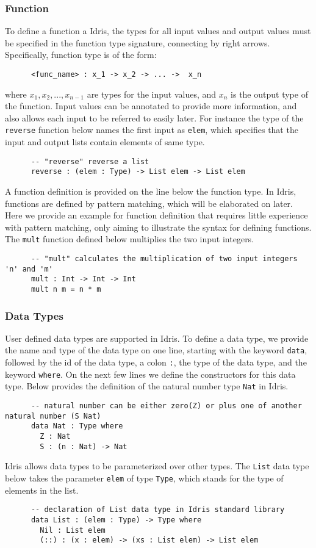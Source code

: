 \subsubsection*{Function}
To define a function a Idris, the types for all input values and output values must be specified in the function type signature, connecting by right arrows. Specifically, function type is of the form: 
\begin{lstlisting}
      <func_name> : x_1 -> x_2 -> ... ->  x_n
\end{lstlisting}
where $x_1, x_2, ..., x_{n-1}$ are types for the input values, and $x_n$ is the output type of the function. Input values can be annotated to provide more information, and also allows each input to be referred to easily later. For instance the type of the \texttt{reverse} function below names the first input as \texttt{elem}, which specifies that the input and output lists contain elements of same type. 
\begin{lstlisting}
      -- "reverse" reverse a list
      reverse : (elem : Type) -> List elem -> List elem
\end{lstlisting}
A function definition is provided on the line below the function type. In Idris, functions are defined by pattern matching, which will be elaborated on later. Here we provide an example for function definition that requires little experience with pattern matching, only aiming to illustrate the syntax for defining functions. The \texttt{mult} function defined below multiplies the two input integers. 
\begin{lstlisting}
      -- "mult" calculates the multiplication of two input integers 'n' and 'm'
      mult : Int -> Int -> Int
      mult n m = n * m
\end{lstlisting}

\subsubsection*{Data Types}
User defined data types are supported in Idris. To define a data type, we provide the name and type of the data type on one line, starting with the keyword \texttt{data}, followed by the id of the data type, a colon \texttt{:}, the type of the data type, and the keyword \texttt{where}. On the next few lines we define the constructors for this data type. Below provides the definition of the natural number type \texttt{Nat} in Idris. 
\begin{lstlisting}
      -- natural number can be either zero(Z) or plus one of another natural number (S Nat)
      data Nat : Type where
        Z : Nat
        S : (n : Nat) -> Nat 
\end{lstlisting}
Idris allows data types to be parameterized over other types. The \texttt{List} data type below takes the parameter \texttt{elem} of type \texttt{Type}, which stands for the type of elements in the list. 
 \begin{lstlisting}
      -- declaration of List data type in Idris standard library
      data List : (elem : Type) -> Type where
        Nil : List elem
        (::) : (x : elem) -> (xs : List elem) -> List elem
\end{lstlisting}


